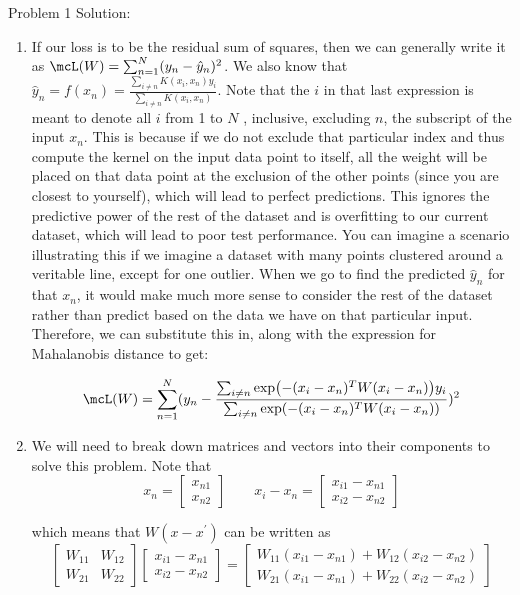 \documentclass[submit]{harvardml}
\begin{document}
\newpage

Problem 1 Solution:
\begin{enumerate}
    \item If our loss is to be the residual sum of squares, then we can generally write it as $\mcL(W)=\sum_{n=1}^N (y_n - \hat{y}_n)^2$. We also know that $\hat{y}_n = f(x_n) = \frac{\sum_{i \neq n} K(x_i, x_n)y_i}{\sum_{i \neq n} K(x_i, x_n)}$. Note that the $i$ in that last expression is meant to denote all $i$ from 1 to $N$ , inclusive, excluding $n$, the subscript of the input $x_n$. This is because if we do not exclude that particular index and thus compute the kernel on the input data point to itself, all the weight will be placed on that data point at the exclusion of the other points (since you are closest to yourself), which will lead to perfect predictions. This ignores the predictive power of the rest of the dataset and is overfitting to our current dataset, which will lead to poor test performance. You can imagine a scenario illustrating this if we imagine a dataset with many points clustered around a veritable line, except for one outlier. When we go to find the predicted $\hat{y}_n$ for that $x_n$, it would make much more sense to consider the rest of the dataset rather than predict based on the data we have on that particular input. Therefore, we can substitute this in, along with the expression for Mahalanobis distance to get:

    $$\mcL(W)=\sum_{n=1}^N (y_n - \frac{\sum_{i \neq n} \exp(-(x_i-x_n)^TW(x_i-x_n))y_i}{\sum_{i \neq n} \exp(-(x_i-x_n)^TW(x_i-x_n))})^2$$

    \item We will need to break down matrices and vectors into their components to solve this problem. Note that
    \begin{equation*}
        x_n = \begin{bmatrix}
          x_{n1} \\
          x_{n2}
        \end{bmatrix}
        \qquad
        x_i - x_n =
        \begin{bmatrix}
          x_{i1} - x_{n1} \\
          x_{i2} - x_{n2}
        \end{bmatrix}
    \end{equation*}

    which means that $W(x-x^')$ can be written as
    \begin{equation*}
        \begin{bmatrix}
          W_{11} & W_{12} \\
          W_{21} & W_{22}
        \end{bmatrix}
        \begin{bmatrix}
          x_{i1} - x_{n1} \\
          x_{i2} - x_{n2}
        \end{bmatrix} =
        \begin{bmatrix}
          W_{11}(x_{i1} - x_{n1}) + W_{12}(x_{i2} - x_{n2}) \\
          W_{21}(x_{i1} - x_{n1}) + W_{22}(x_{i2} - x_{n2})
        \end{bmatrix}
    \end{equation*}


\end{enumerate}
\end{document}
